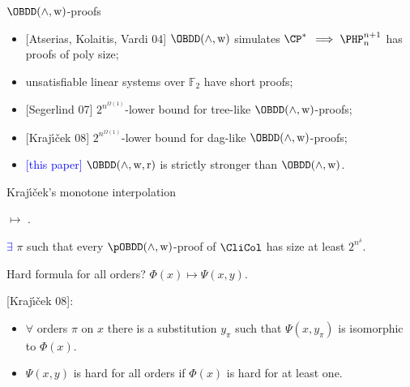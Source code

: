 \begin{frame}{$\OBDD(\land, \weakening)$-proofs}
    \begin{itemize}
        \item{} [Atserias, Kolaitis, Vardi 04] $\OBDD(\land, \weakening)$ simulates $\CP^*$
            \pause $\implies \PHP^{n + 1}_n$ has proofs of poly size;
        \pause
        \item{} unsatisfiable linear systems over $\mathbb{F}_2$ have short proofs;
        \pause
        \item{} [Segerlind 07] $2^{n^{\Omega(1)}}$-lower bound for tree-like $\OBDD(\land,
            \weakening)$-proofs;
        \pause
        \item{} [Kraj{\'{\i}}{\v{c}}ek 08] $2^{n^{\Omega(1)}}$-lower bound for dag-like $\OBDD(\land,
            \weakening)$-proofs;
        \pause
        \item{} \textcolor{blue}{[this paper]} $\OBDD(\land, \weakening,
            \reordering)$ is strictly stronger than $\OBDD(\land, \weakening)$.
    \end{itemize}
\end{frame}

\begin{frame}{Kraj{\'{\i}}{\v{c}}ek's monotone interpolation}

     $\mapsto$
    .

    \pause

    \begin{theorem}[Kraj{\'{\i}}{\v{c}}ek 08]
        \textcolor{blue}{$\exists$} $\pi$ such that every $\pOBDD(\land,
        \weakening)$-proof of $\CliCol$ has size at least $2^{n^{\delta}}$.
    \end{theorem}

    \pause
    Hard formula for all orders? \pause $\Phi(x) \mapsto \Psi(x, y)$.

    \pause
    {[Kraj{\'{\i}}{\v{c}}ek 08]}:
    \begin{itemize}
        \item $\forall$ orders $\pi$ on $x$ there is a substitution $y_{\pi}$ such that $\Psi(x,
            y_{\pi})$ is isomorphic to $\Phi(x)$.
        \item $\Psi(x, y)$ is hard for all orders if $\Phi(x)$ is hard for at least one.
    \end{itemize}
\end{frame}

